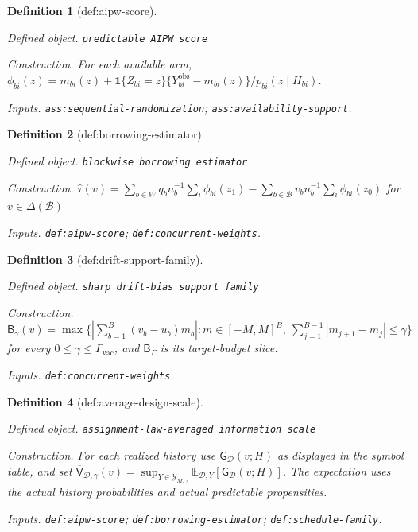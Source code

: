 \documentclass{article}
\newtheorem{definition}{Definition}
\begin{document}
\begin{definition}[def:aipw-score]\label{def:aipw-score}
\par\smallskip\noindent\emph{Defined object.} \texttt{predictable AIPW score}
\par\smallskip\noindent\emph{Construction.} For each available arm, \(\phi_{bi}(z)=m_{bi}(z)+\mathbf 1\{Z_{bi}=z\}\{Y^{\mathrm{obs}}_{bi}-m_{bi}(z)\}/p_{bi}(z\mid H_{bi})\).
\par\smallskip\noindent\emph{Inputs.} \texttt{ass:\allowbreak{}sequential-\allowbreak{}randomization}; \texttt{ass:\allowbreak{}availability-\allowbreak{}support}.
\end{definition}

\begin{definition}[def:borrowing-estimator]\label{def:borrowing-estimator}
\par\smallskip\noindent\emph{Defined object.} \texttt{blockwise borrowing estimator}
\par\smallskip\noindent\emph{Construction.} \(\widehat\tau(v)=\sum_{b\in W}q_b n_b^{-1}\sum_i\phi_{bi}(z_1)-\sum_{b\in\mathcal B}v_b n_b^{-1}\sum_i\phi_{bi}(z_0)\) for \(v\in\Delta(\mathcal B)\)
\par\smallskip\noindent\emph{Inputs.} \texttt{def:\allowbreak{}aipw-\allowbreak{}score}; \texttt{def:\allowbreak{}concurrent-\allowbreak{}weights}.
\end{definition}

\begin{definition}[def:drift-support-family]\label{def:drift-support-family}
\par\smallskip\noindent\emph{Defined object.} \texttt{sharp drift-\allowbreak{}bias support family}
\par\smallskip\noindent\emph{Construction.} \(\mathsf B_\gamma(v)=\max\{|\sum_{b=1}^B(v_b-u_b)m_b|:m\in[-M,M]^B,\ \sum_{j=1}^{B-1}|m_{j+1}-m_j|\le\gamma\}\) for every \(0\le\gamma\le\Gamma_{\mathrm{vac}}\), and \(\mathsf B_\Gamma\) is its target-budget slice.
\par\smallskip\noindent\emph{Inputs.} \texttt{def:\allowbreak{}concurrent-\allowbreak{}weights}.
\end{definition}

\begin{definition}[def:average-design-scale]\label{def:average-design-scale}
\par\smallskip\noindent\emph{Defined object.} \texttt{assignment-\allowbreak{}law-\allowbreak{}averaged information scale}
\par\smallskip\noindent\emph{Construction.} For each realized history use \(\mathsf G_{\mathcal D}(v;H)\) as displayed in the symbol table, and set \(\overline{\mathsf V}_{\mathcal D,\gamma}(v)=\sup_{Y\in\mathcal Y_{M,\gamma}}\mathbb E_{\mathcal D,Y}[\mathsf G_{\mathcal D}(v;H)]\). The expectation uses the actual history probabilities and actual predictable propensities.
\par\smallskip\noindent\emph{Inputs.} \texttt{def:\allowbreak{}aipw-\allowbreak{}score}; \texttt{def:\allowbreak{}borrowing-\allowbreak{}estimator}; \texttt{def:\allowbreak{}schedule-\allowbreak{}family}.
\end{definition}
\end{document}
